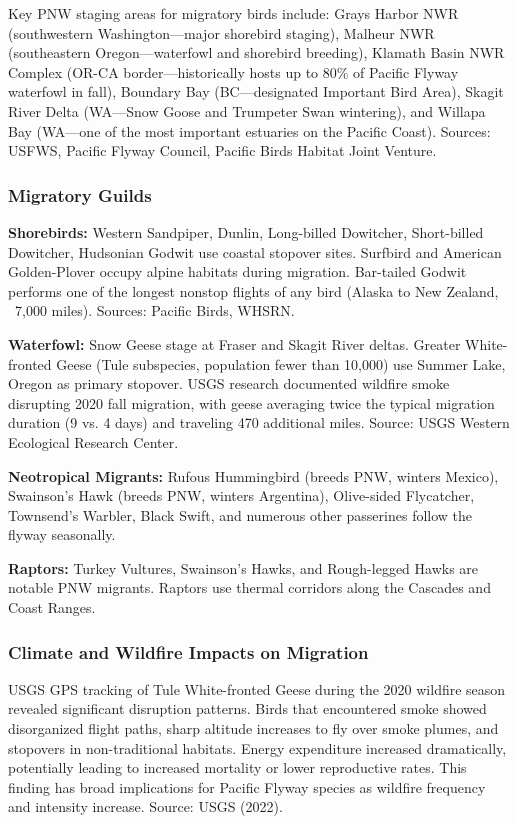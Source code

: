 \documentclass[11pt,letterpaper]{article}
\begin{document}
Key PNW staging areas for migratory birds include: Grays Harbor NWR (southwestern Washington---major shorebird staging), Malheur NWR (southeastern Oregon---waterfowl and shorebird breeding), Klamath Basin NWR Complex (OR-CA border---historically hosts up to 80\% of Pacific Flyway waterfowl in fall), Boundary Bay (BC---designated Important Bird Area), Skagit River Delta (WA---Snow Goose and Trumpeter Swan wintering), and Willapa Bay (WA---one of the most important estuaries on the Pacific Coast). Sources: USFWS, Pacific Flyway Council, Pacific Birds Habitat Joint Venture.

\subsubsection{Migratory Guilds}
\textbf{Shorebirds:} Western Sandpiper, Dunlin, Long-billed Dowitcher, Short-billed Dowitcher, Hudsonian Godwit use coastal stopover sites. Surfbird and American Golden-Plover occupy alpine habitats during migration. Bar-tailed Godwit performs one of the longest nonstop flights of any bird (Alaska to New Zealand, ~7,000 miles). Sources: Pacific Birds, WHSRN.

\textbf{Waterfowl:} Snow Geese stage at Fraser and Skagit River deltas. Greater White-fronted Geese (Tule subspecies, population fewer than 10,000) use Summer Lake, Oregon as primary stopover. USGS research documented wildfire smoke disrupting 2020 fall migration, with geese averaging twice the typical migration duration (9 vs. 4 days) and traveling 470 additional miles. Source: USGS Western Ecological Research Center.

\textbf{Neotropical Migrants:} Rufous Hummingbird (breeds PNW, winters Mexico), Swainson's Hawk (breeds PNW, winters Argentina), Olive-sided Flycatcher, Townsend's Warbler, Black Swift, and numerous other passerines follow the flyway seasonally.

\textbf{Raptors:} Turkey Vultures, Swainson's Hawks, and Rough-legged Hawks are notable PNW migrants. Raptors use thermal corridors along the Cascades and Coast Ranges.

\subsubsection{Climate and Wildfire Impacts on Migration}
USGS GPS tracking of Tule White-fronted Geese during the 2020 wildfire season revealed significant disruption patterns. Birds that encountered smoke showed disorganized flight paths, sharp altitude increases to fly over smoke plumes, and stopovers in non-traditional habitats. Energy expenditure increased dramatically, potentially leading to increased mortality or lower reproductive rates. This finding has broad implications for Pacific Flyway species as wildfire frequency and intensity increase. Source: USGS (2022).
\end{document}
